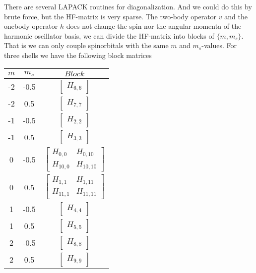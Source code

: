 There are several LAPACK routines for diagonalization. And we could do this by brute force, but the HF-matrix is very sparse. The two-body operator $v$ and the onebody operator $h$ does not change the spin nor the angular momenta of the harmonic oscillator basis, we can divide the HF-matrix into blocks of $\{m,m_s\}$. That is we can only couple spinorbitals with the same $m$ and $m_s$-values. For three shells we have the following block matrices

\begin{table}[H]
\begin{minipage}[b]{0.5\linewidth}\centering 
\begin{tabular}{ccc}
\toprule
$m$ & $m_s$ & $Block$\\
\midrule
-2	& -0.5 	 &  $\begin{bmatrix}H_{6,6}\end{bmatrix}$ \\
-2	& 0.5 	 &  $\begin{bmatrix}H_{7,7}\end{bmatrix}$ \\
-1	& -0.5 	 &  $\begin{bmatrix}H_{2,2}\end{bmatrix}$ \\
-1	& 0.5 	 &  $\begin{bmatrix}H_{3,3}\end{bmatrix}$ \\
0	& -0.5 	 &  $\begin{bmatrix}H_{0,0} & H_{0,10} \\ H_{10,0} & H_{10,10} \end{bmatrix}$ \\
0	& 0.5 	 &  $\begin{bmatrix}H_{1,1} & H_{1,11} \\ H_{11,1} & H_{11,11} \end{bmatrix}$ \\
1	& -0.5 	 &  $\begin{bmatrix}H_{4,4}\end{bmatrix}$ \\
1	& 0.5 	 &  $\begin{bmatrix}H_{5,5}\end{bmatrix}$ \\
2	& -0.5 	 &  $\begin{bmatrix}H_{8,8}\end{bmatrix}$ \\
2	& 0.5 	 &  $\begin{bmatrix}H_{9,9}\end{bmatrix}$ \\

\end{tabular}
\end{minipage}
\end{table}
